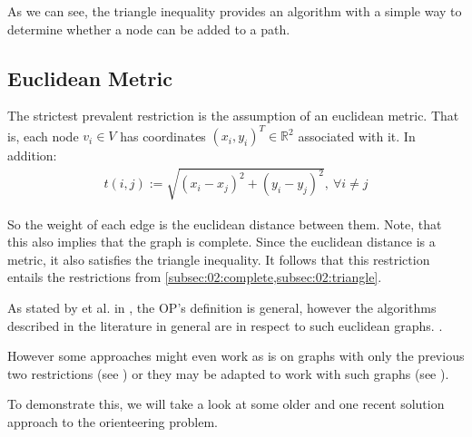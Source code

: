 As we can see, the triangle inequality provides an algorithm with a simple way to determine whether a node can be added to a path.

\subsection{Euclidean Metric}
\label{subsec:02:euclidean}

The strictest prevalent restriction is the assumption of an euclidean metric. 
That is, each node $v_i \in V$ has coordinates $(x_i, y_i)^T \in \mathbb{R}^2$ associated with it.
In addition: 
\begin{align*}
  t(i,j) := \sqrt{(x_i - x_j)^2 + (y_i - y_j)^2},\ \forall i \neq j
\end{align*}

So the weight of each edge is the euclidean distance between them. Note, that this also implies that the graph is complete.
Since the euclidean distance is a metric, it also satisfies the triangle inequality.
It follows that this restriction entails the restrictions from \cref{subsec:02:complete,subsec:02:triangle}.

As stated by \citeauthor{vansteenwegen_orienteering_2011} et al. in \cite{vansteenwegen_orienteering_2011}, the OP's definition is general, however the algorithms described in the literature in general are in respect to such euclidean graphs. \cite{golden_orienteering_1987,tsiligiridis_heuristic_1984,szwarc_novel_2022}.

However some approaches might even work as is on graphs with only the previous two restrictions (see ) or they may be adapted to work with such graphs (see ). 

To demonstrate this, we will take a look at some older \cite{tsiligiridis_heuristic_1984} and one recent \cite{szwarc_novel_2022} solution approach to the orienteering problem.

